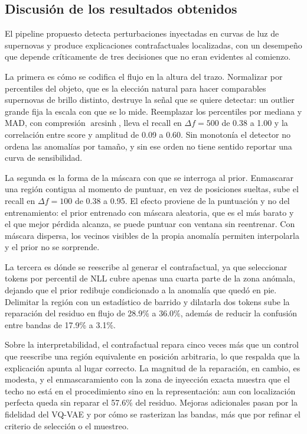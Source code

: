 \subsection{Discusión de los resultados obtenidos}

El pipeline propuesto detecta perturbaciones inyectadas en curvas de luz de supernovas y produce explicaciones contrafactuales localizadas, con un desempeño que depende críticamente de tres decisiones que no eran evidentes al comienzo.

La primera es cómo se codifica el flujo en la altura del trazo. Normalizar por percentiles del objeto, que es la elección natural para hacer comparables supernovas de brillo distinto, destruye la señal que se quiere detectar: un outlier grande fija la escala con que se lo mide. Reemplazar los percentiles por mediana y MAD, con compresión $\operatorname{arcsinh}$, lleva el recall en $\Delta f = 500$ de 0.38 a 1.00 y la correlación entre score y amplitud de 0.09 a 0.60. Sin monotonía el detector no ordena las anomalías por tamaño, y sin ese orden no tiene sentido reportar una curva de sensibilidad.

La segunda es la forma de la máscara con que se interroga al prior. Enmascarar una región contigua al momento de puntuar, en vez de posiciones sueltas, sube el recall en $\Delta f = 100$ de 0.38 a 0.95. El efecto proviene de la puntuación y no del entrenamiento: el prior entrenado con máscara aleatoria, que es el más barato y el que mejor pérdida alcanza, se puede puntuar con ventana sin reentrenar. Con máscara dispersa, los vecinos visibles de la propia anomalía permiten interpolarla y el prior no se sorprende.

La tercera es dónde se reescribe al generar el contrafactual, ya que seleccionar tokens por percentil de NLL cubre apenas una cuarta parte de la zona anómala, dejando que el prior redibuje condicionado a la anomalía que quedó en pie. Delimitar la región con un estadístico de barrido y dilatarla dos tokens sube la reparación del residuo en flujo de 28.9\% a 36.0\%, además de reducir la confusión entre bandas de 17.9\% a 3.1\%.

Sobre la interpretabilidad, el contrafactual repara cinco veces más que un control que reescribe una región equivalente en posición arbitraria, lo que respalda que la explicación apunta al lugar correcto. La magnitud de la reparación, en cambio, es modesta, y el enmascaramiento con la zona de inyección exacta muestra que el techo no está en el procedimiento sino en la representación: aun con localización perfecta queda sin reparar el 57.6\% del residuo. Mejoras adicionales pasan por la fidelidad del VQ-VAE y por cómo se rasterizan las bandas, más que por refinar el criterio de selección o el muestreo.


